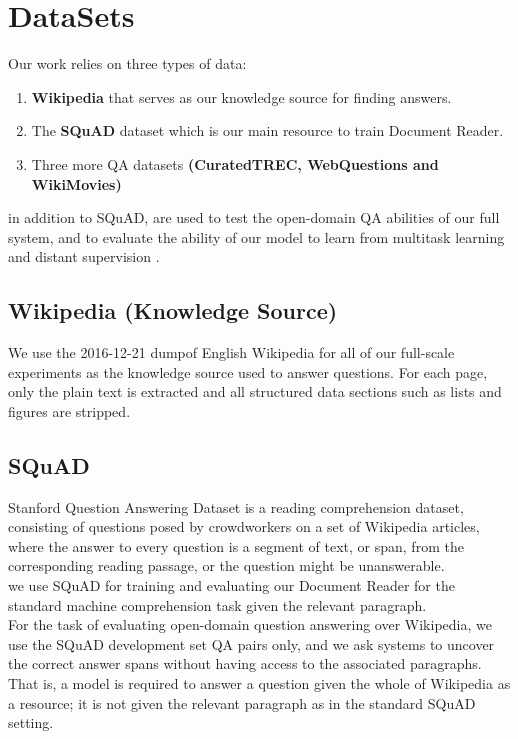 \section{DataSets}
\label{chap:Datasets}

  Our work relies on three types of data:
  \begin{enumerate}
      \item \textbf{Wikipedia} that serves as our knowledge source for finding answers.
      \item The \textbf{SQuAD} dataset which is our main resource to train Document Reader.
      \item Three more QA datasets \textbf{(CuratedTREC, WebQuestions and WikiMovies)}
  \end{enumerate}
  in addition to SQuAD, are used to test the open-domain QA abilities of our full system, and to evaluate the ability of our model to learn from multitask learning and distant supervision \cite{P17-1171}.
  \subsection{Wikipedia (Knowledge Source)}
  We use the 2016-12-21 dump\cite{web032}\@ of English Wikipedia for all of our full-scale experiments as the knowledge source used to answer questions. For each page, only the plain text is extracted and all structured data sections such as lists and figures are stripped\cite{web033}\@.
  \subsection{SQuAD}\label{SQuAD}
  Stanford Question Answering Dataset is a reading comprehension dataset, consisting of questions posed by crowdworkers on a set of Wikipedia articles, where the answer to every question is a segment of text, or span, from the corresponding reading passage, or the question might be unanswerable\cite{web034}\@.\\
  we use SQuAD for training and evaluating our Document Reader for the standard machine comprehension task given the relevant paragraph.\\
  For the task of evaluating open-domain question answering over Wikipedia, we use the SQuAD development set QA pairs only, and we ask systems to uncover the correct answer spans without having access to the associated paragraphs. That is, a model is required to answer a question given the whole of Wikipedia as a resource; it is not given the relevant paragraph as in the standard SQuAD setting.
